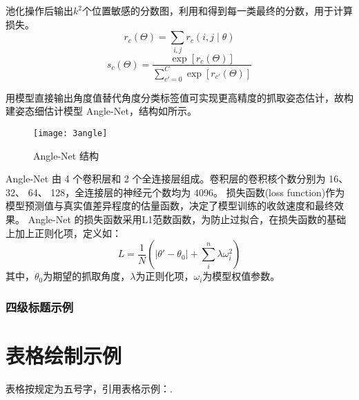 \documentclass{hitszthesis}
\begin{document}
池化操作后输出$k^2$个位置敏感的分数图，利用和得到每一类最终的分数，用于计算损失。
\begin{equation}
r_c(\Theta)=\sum_{i,j}r_c(i,j\mid\theta)
\label{eqrc}
\end{equation}
\begin{equation}
s_c(\Theta)=\dfrac{\exp[{r_c(\Theta)}]}{\sum\limits_{c'=0}^C\exp[{r_{c'}(\Theta)}]}
\label{eqsc}
\end{equation}

用模型直接输出角度值替代角度分类标签值可实现更高精度的抓取姿态估计，故构建姿态细估计模型 Angle-Net，结构如所示。

\begin{figure}[!htbp]
	\centering
	\texttt{[image: 3angle]}
	\caption{Angle-Net 结构}
     \label{figangle}
\end{figure}

Angle-Net 由 4 个卷积层和 2 个全连接层组成。卷积层的卷积核个数分别为 16、 32、 64、 128，全连接层的神经元个数均为 4096。 损失函数(loss function)作为模型预测值与真实值差异程度的估量函数，决定了模型训练的收敛速度和最终效果。 Angle-Net 的损失函数采用L1范数函数，为防止过拟合，在损失函数的基础上加上正则化项，定义如：
\begin{equation}
L=\frac{1}{N}\left(\Big|\theta'-\theta_0\Big|+\sum\limits_i^n\lambda\omega_i^2\right)
\label{eqnor}
\end{equation}
其中，$\theta_0$为期望的抓取角度，$\lambda$为正则化项，$\omega_i$为模型权值参数。

\subsubsection{四级标题示例}

\section{表格绘制示例}

表格按规定为五号字，引用表格示例：.
\end{document}
